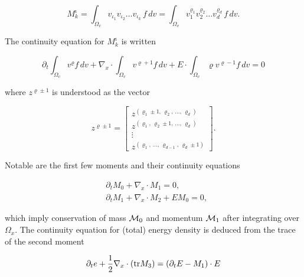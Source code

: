 \begin{equation}\label{eq:multiindex}
    M_k^\iota = \int_{\Omega_v} v_{\iota_1} v_{\iota_2} \ldots v_{\iota_k}\, f \,dv
    = \int_{\Omega_v} v_1^{\varrho_1} v_2^{\varrho_2} \ldots v_d^{\varrho_d}\, f \,dv . 
\end{equation}

The continuity equation for $M_k^\iota$ is written 

\begin{equation}
    \partial_t \int_{\Omega_v} v^\varrho f \,dv 
    + \nabla_x \cdot \int_{\Omega_v} v^{\varrho + 1} f \,dv
    + E \cdot \int_{\Omega_v} \varrho v^{\varrho - 1} f \,dv = 0
\end{equation}

where $z^{\varrho \pm 1}$ is understood as the vector

\begin{equation}\label{eq:continuity}
    z^{\varrho \pm 1} = \begin{bmatrix}
        z^{\left( \varrho_1 \pm 1,\, \varrho_2,\, \ldots,\, \varrho_d \right)} \\
        z^{\left( \varrho_1,\, \varrho_2 \pm 1,\, \ldots,\, \varrho_d \right)} \\
        \vdots \\
        z^{\left( \varrho_1,\, \ldots,\, \varrho_{d-1},\, \varrho_d \pm 1 \right)}
    \end{bmatrix} . 
\end{equation}

Notable are the first few moments and their continuity equations

\begin{align}
    &\partial_t M_0 + \nabla_x \cdot M_1 = 0, \label{eq:mass_continuity}\\
    &\partial_t M_1 + \nabla_x \cdot M_2 + E M_0 = 0, \label{eq:momentum_continuity}%
\end{align}

which imply conservation of mass $\mathcal{M}_0$ and momentum $\mathcal{M}_1$ 
after integrating over $\Omega_x$. The continuity equation for (total) 
energy density is deduced from the trace of the second moment

\begin{equation}\label{eq:energy_continuity}
    \partial_t e + \frac{1}{2} \nabla_x \cdot (\text{tr} M_3) = (\partial_t E - M_1) \cdot E
\end{equation}

